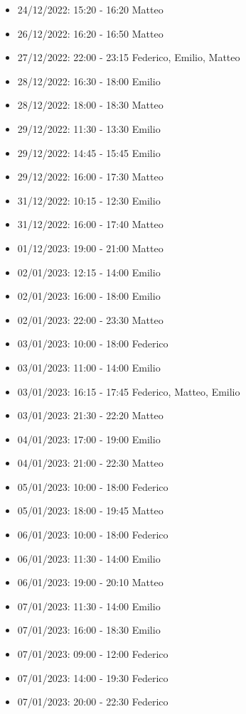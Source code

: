 \begin{itemize}
    \item 24/12/2022: 15:20 - 16:20 Matteo
    \item 26/12/2022: 16:20 - 16:50 Matteo
    \item 27/12/2022: 22:00 - 23:15 Federico, Emilio, Matteo
    \item 28/12/2022: 16:30 - 18:00 Emilio
    \item 28/12/2022: 18:00 - 18:30 Matteo
    \item 29/12/2022: 11:30 - 13:30 Emilio
    \item 29/12/2022: 14:45 - 15:45 Emilio
    \item 29/12/2022: 16:00 - 17:30 Matteo
    \item 31/12/2022: 10:15 - 12:30 Emilio
    \item 31/12/2022: 16:00 - 17:40 Matteo
    \item 01/12/2023: 19:00 - 21:00 Matteo
    \item 02/01/2023: 12:15 - 14:00 Emilio
    \item 02/01/2023: 16:00 - 18:00 Emilio
    \item 02/01/2023: 22:00 - 23:30 Matteo
    \item 03/01/2023: 10:00 - 18:00 Federico
    \item 03/01/2023: 11:00 - 14:00 Emilio
    \item 03/01/2023: 16:15 - 17:45 Federico, Matteo, Emilio
    \item 03/01/2023: 21:30 - 22:20 Matteo
    \item 04/01/2023: 17:00 - 19:00 Emilio
    \item 04/01/2023: 21:00 - 22:30 Matteo
    \item 05/01/2023: 10:00 - 18:00 Federico
    \item 05/01/2023: 18:00 - 19:45 Matteo
    \item 06/01/2023: 10:00 - 18:00 Federico
    \item 06/01/2023: 11:30 - 14:00 Emilio
    \item 06/01/2023: 19:00 - 20:10 Matteo
    \item 07/01/2023: 11:30 - 14:00 Emilio
    \item 07/01/2023: 16:00 - 18:30 Emilio
    \item 07/01/2023: 09:00 - 12:00 Federico
    \item 07/01/2023: 14:00 - 19:30 Federico
    \item 07/01/2023: 20:00 - 22:30 Federico
\end{itemize}
\clearpage